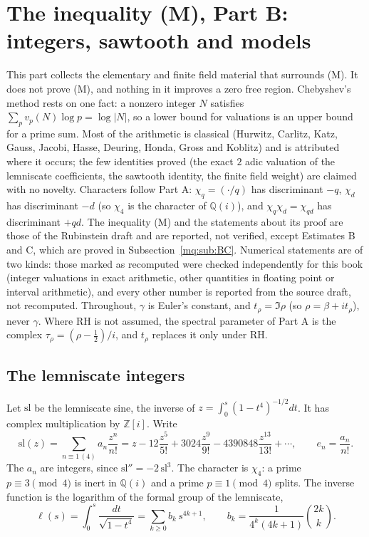 \section{The inequality (M), Part B: integers, sawtooth and models}\label{mql:sec:partb}

This part collects the elementary and finite field material that surrounds (M). It does not prove (M), and nothing in it improves a zero free region. Chebyshev's method rests on one fact: a nonzero integer $N$ satisfies $\sum_pv_p(N)\log p=\log|N|$, so a lower bound for valuations is an upper bound for a prime sum. Most of the arithmetic is classical (Hurwitz, Carlitz, Katz, Gauss, Jacobi, Hasse, Deuring, Honda, Gross and Koblitz) and is attributed where it occurs; the few identities proved (the exact $2$ adic valuation of the lemniscate coefficients, the sawtooth identity, the finite field weight) are claimed with no novelty. Characters follow Part A: $\chi_q=(\cdot/q)$ has discriminant $-q$, $\chi_d$ has discriminant $-d$ (so $\chi_4$ is the character of $\mathbb Q(i)$), and $\chi_q\chi_d=\chi_{qd}$ has discriminant $+qd$. The inequality (M) and the statements about its proof are those of the Rubinstein draft \cite{Rub26} and are reported, not verified, except Estimates B and C, which are proved in Subsection~\ref{mq:sub:BC}. Numerical statements are of two kinds: those marked as recomputed were checked independently for this book (integer valuations in exact arithmetic, other quantities in floating point or interval arithmetic), and every other number is reported from the source draft, not recomputed. Throughout, $\gamma$ is Euler's constant, and $t_\rho=\Im\rho$ (so $\rho=\beta+it_\rho$), never $\gamma$. Where RH is not assumed, the spectral parameter of Part A is the complex $\tau_\rho=(\rho-\frac12)/i$, and $t_\rho$ replaces it only under RH.

\subsection{The lemniscate integers}\label{mql:sub:lemn}

Let $\mathrm{sl}$ be the lemniscate sine, the inverse of $z=\int_0^s(1-t^4)^{-1/2}dt$. It has complex multiplication by $\mathbb Z[i]$. Write
\[
\mathrm{sl}(z)=\sum_{n\equiv1\,(4)}a_n\frac{z^n}{n!}=z-12\frac{z^5}{5!}+3024\frac{z^9}{9!}-4390848\frac{z^{13}}{13!}+\cdots,\qquad e_n=\frac{a_n}{n!}.
\]
The $a_n$ are integers, since $\mathrm{sl}''=-2\,\mathrm{sl}^3$. The character is $\chi_{4}$: a prime $p\equiv3\pmod4$ is inert in $\mathbb Q(i)$ and a prime $p\equiv1\pmod4$ splits. The inverse function is the logarithm of the formal group of the lemniscate,
\[
\ell(s)=\int_0^s\frac{dt}{\sqrt{1-t^4}}=\sum_{k\ge0}b_k\,s^{4k+1},\qquad b_k=\frac{1}{4^k(4k+1)}\binom{2k}{k}.
\]

